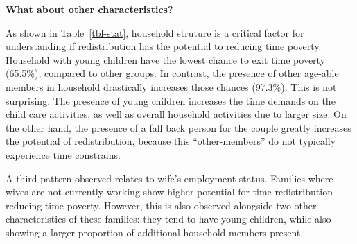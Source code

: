 \documentclass[
  11pt,
]{article}
\begin{document}
\textbf{What about other characteristics?}

As shown in Table~\ref{tbl-stat}, household struture is a critical
factor for understanding if redistribution has the potential to reducing
time poverty. Household with young children have the lowest chance to
exit time poverty (65.5\%), compared to other groups. In contrast, the
presence of other age-able members in household drastically increases
those chances (97.3\%). This is not surprising. The presence of young
children increases the time demands on the child care activities, as
well as overall household activities due to larger size. On the other
hand, the presence of a fall back person for the couple greatly
increases the potential of redistribution, because this
``other-members'' do not typically experience time constrains.

A third pattern observed relates to wife's employment status. Families
where wives are not currently working show higher potential for time
redistribution reducing time poverty. However, this is also observed
alongside two other characteristics of these families: they tend to have
young children, while also showing a larger proportion of additional
household members present.

\begin{table}

\caption{\label{tbl-stat}Summary Statistics Population}


\end{table}%
\end{document}
